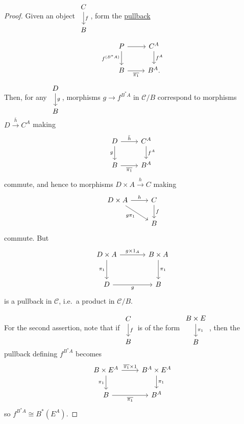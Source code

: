 \documentclass{article}
\begin{document}
\begin{proof}
  Given an object $\begin{tikzcd}C \dar{f} \\ B\end{tikzcd}$, form the \hyperlink{def:pullback}{pullback}
  \begin{equation*}
    \begin{tikzcd}
      P \rar \dar[']{f^{(B^*A)}} & C^A \dar{f^A}\\
      B \rar[']{\overline{\pi_1}} & B^A.
    \end{tikzcd}
  \end{equation*}
  Then, for any $\begin{tikzcd}D \dar{g} \\ B\end{tikzcd}$, morphisms $g \to f^{B^*A}$ in $\mathscr{C}/B$ correspond to morphisms $D \xrightarrow{\bar{h}} C^A$ making
  \begin{equation*}
  \begin{tikzcd}
    D \rar{\bar{h}} \dar[']{g} & C^A \dar{f^A} \\ B \rar[']{\overline{\pi_1}} & B^A
  \end{tikzcd}
  \end{equation*}
  commute, and hence to morphisms $D \times A \xrightarrow{h} C$ making
  \begin{equation*}
  \begin{tikzcd}
    D\times A \rar{h} \drar[']{g \pi_1} & C \dar{f} \\
                                     & B
  \end{tikzcd}
  \end{equation*}
  commute. But
  \begin{equation*}
    \begin{tikzcd}[sep=large]
      D \times A \rar{g \times 1_A} \dar[']{\pi_1} & B \times A \dar{\pi_1} \\
      D \rar[']{g} & B
    \end{tikzcd}
  \end{equation*}
  is a pullback in $\mathscr{C}$, i.e.\ a product in \hyperlink{def:slice}{$\mathscr{C}/B$}.

  For the second assertion, note that if $\begin{tikzcd}C \dar{f} \\ B\end{tikzcd}$ is of the form $\begin{tikzcd}B \times E \dar{\pi_1} \\ B\end{tikzcd}$, then the pullback defining $f^{B^* A}$ becomes
  \begin{equation*}
  \begin{tikzcd}
    B \times E^A \rar{\overline{\pi_1} \times 1} \dar[']{\pi_1} & B^A \times E^A \dar{\pi_1} \\
    B \rar[']{\overline{\pi_1}} & B^A
  \end{tikzcd}
  \end{equation*}
  so $f^{B^* A} \cong B^*(E^A)$.
\end{proof}
\end{document}
